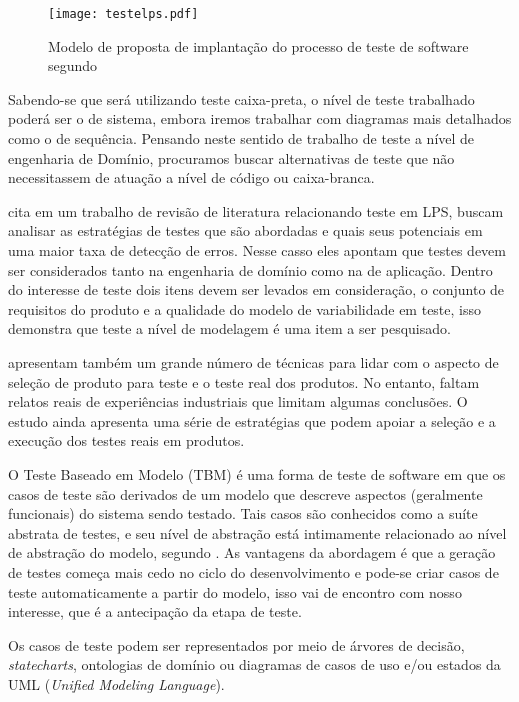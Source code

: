 \begin{figure}[htb]
	\centering
	\texttt{[image: testelps.pdf]}
	\caption{ Modelo de proposta de implantação do processo de teste de software segundo \cite{crespo2004metodologia}}
	\label{fig:testelps}
\end{figure}

Sabendo-se que será utilizando teste caixa-preta, o nível de teste trabalhado poderá ser o de sistema, embora iremos trabalhar com diagramas mais detalhados como o de sequência. Pensando neste sentido de trabalho de teste a nível de engenharia de Domínio, procuramos buscar alternativas de teste que não necessitassem de atuação a nível de código ou caixa-branca.

\citealp{do2014strategies} cita em um trabalho de revisão de literatura relacionando teste em LPS, buscam analisar as estratégias de testes que são abordadas e quais seus potenciais em uma maior taxa de detecção de erros. Nesse casso eles apontam que testes devem ser considerados tanto na engenharia de domínio como na de aplicação. Dentro do interesse de teste dois itens devem ser levados em consideração, o conjunto de requisitos do produto e a qualidade do modelo de variabilidade em teste, isso demonstra que teste a nível de modelagem é uma item a ser pesquisado.

\citealp{do2014strategies} apresentam também um grande número de técnicas para lidar com o aspecto de seleção de produto para teste e o teste real dos produtos. No entanto, faltam relatos reais de experiências industriais que limitam algumas conclusões. O estudo ainda apresenta uma série de estratégias que podem apoiar a seleção e a execução dos testes reais em produtos.

O Teste Baseado em Modelo (TBM) é uma forma de teste de software em que os casos de teste são derivados de um modelo que descreve aspectos (geralmente funcionais) do sistema sendo testado. Tais casos são conhecidos como a suíte abstrata de testes, e seu nível de abstração está intimamente relacionado ao nível de abstração do modelo, segundo \citealp{do2014strategies}. As vantagens da abordagem é que a geração de testes começa mais cedo no ciclo do desenvolvimento e pode-se criar casos de teste automaticamente a partir do modelo, isso vai de encontro com nosso interesse, que é a antecipação da etapa de teste. 

Os casos de teste podem ser representados por meio de árvores de decisão, \textit{statecharts}, ontologias de domínio ou diagramas de casos de uso e/ou estados da UML (\textit{Unified Modeling Language})\cite{isa2017model}.

